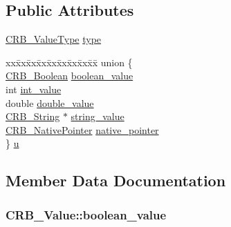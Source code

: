 \subsection*{Public Attributes}
\begin{DoxyCompactItemize}
\item 
\hyperlink{_c_r_b__dev_8h_a1a82f38e78e95951e6a9cdc0f5fd4a3a}{C\+R\+B\+\_\+\+Value\+Type} \hyperlink{struct_c_r_b___value_acda650198a166ebbcfdbe3e59c16c48d}{type}
\item 
\begin{tabbing}
xx\=xx\=xx\=xx\=xx\=xx\=xx\=xx\=xx\=\kill
union \{\\
\>\hyperlink{_c_r_b__dev_8h_a5000f2b447c9132c07d7f1cf66134a69}{CRB\_Boolean} \hyperlink{struct_c_r_b___value_ab7a1cd9cc805aa5147dff85998ce9a35}{boolean\_value}\\
\>int \hyperlink{struct_c_r_b___value_af4f8c00699f88b1f66df39533d8a954d}{int\_value}\\
\>double \hyperlink{struct_c_r_b___value_a5d6c2992019285bdf7999e4f577e2a40}{double\_value}\\
\>\hyperlink{_c_r_b__dev_8h_a0372b51b327f3425e983d9924fc713f8}{CRB\_String} $\ast$ \hyperlink{struct_c_r_b___value_abbb38f47b1039d6332e5ccc6e2075ec4}{string\_value}\\
\>\hyperlink{struct_c_r_b___native_pointer}{CRB\_NativePointer} \hyperlink{struct_c_r_b___value_a7aaf59723f27b15f1fcc17bb5dce1edf}{native\_pointer}\\
\} \hyperlink{struct_c_r_b___value_aac6984702013a49c5f0e75e84cfc5bdd}{u}\\

\end{tabbing}\end{DoxyCompactItemize}


\subsection{Member Data Documentation}
\hypertarget{struct_c_r_b___value_ab7a1cd9cc805aa5147dff85998ce9a35}{}
\subsubsection[{boolean\+\_\+value}]{ C\+R\+B\+\_\+\+Value\+::boolean\+\_\+value}\label{struct_c_r_b___value_ab7a1cd9cc805aa5147dff85998ce9a35}
\hypertarget{struct_c_r_b___value_a5d6c2992019285bdf7999e4f577e2a40}{}
